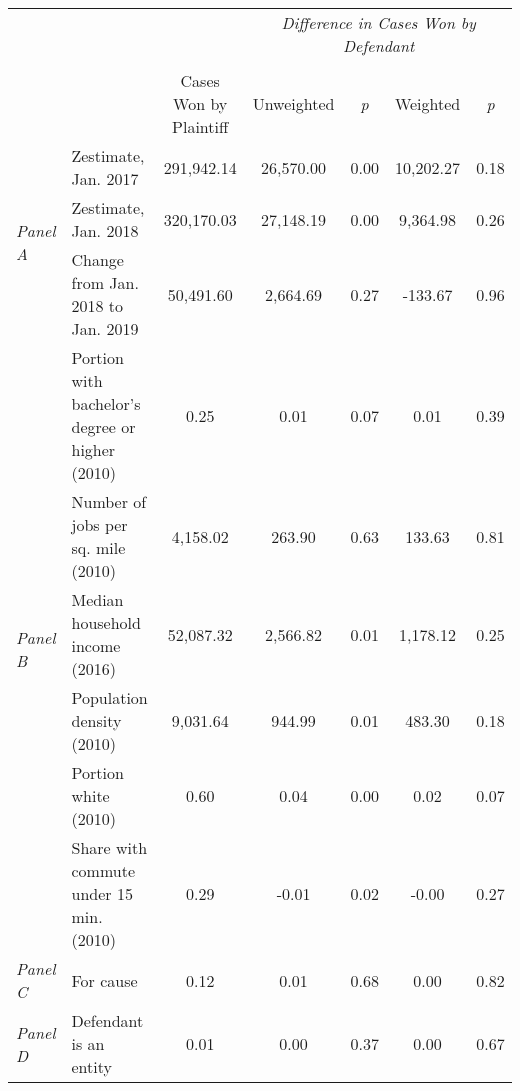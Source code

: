\begin{tabular}{llccccc}
\toprule
 &  & \textit{} & \multicolumn{4}{|c|}{\textit{Difference in Cases Won by Defendant}} \\
\cline{4-7}
\\
 &  & Cases Won by Plaintiff & Unweighted & \emph{p} & Weighted & \emph{p} \\
\midrule
\multirow[c]{3}{3cm}{\textit{Panel A}} & Zestimate, Jan. 2017 & 291,942.14 & 26,570.00 & 0.00 & 10,202.27 & 0.18 \\
 & Zestimate, Jan. 2018 & 320,170.03 & 27,148.19 & 0.00 & 9,364.98 & 0.26 \\
 & Change from Jan. 2018 to Jan. 2019 & 50,491.60 & 2,664.69 & 0.27 & -133.67 & 0.96 \\
\cline{1-7}
\multirow[c]{6}{3cm}{\textit{Panel B}} & Portion with bachelor's degree or higher (2010) & 0.25 & 0.01 & 0.07 & 0.01 & 0.39 \\
 & Number of jobs per sq. mile (2010) & 4,158.02 & 263.90 & 0.63 & 133.63 & 0.81 \\
 & Median household income (2016) & 52,087.32 & 2,566.82 & 0.01 & 1,178.12 & 0.25 \\
 & Population density (2010) & 9,031.64 & 944.99 & 0.01 & 483.30 & 0.18 \\
 & Portion white (2010) & 0.60 & 0.04 & 0.00 & 0.02 & 0.07 \\
 & Share with commute under 15 min. (2010) & 0.29 & -0.01 & 0.02 & -0.00 & 0.27 \\
\cline{1-7}
\textit{Panel C} & For cause & 0.12 & 0.01 & 0.68 & 0.00 & 0.82 \\
\cline{1-7}
\textit{Panel D} & Defendant is an entity & 0.01 & 0.00 & 0.37 & 0.00 & 0.67 \\
\cline{1-7}
\bottomrule
\end{tabular}

